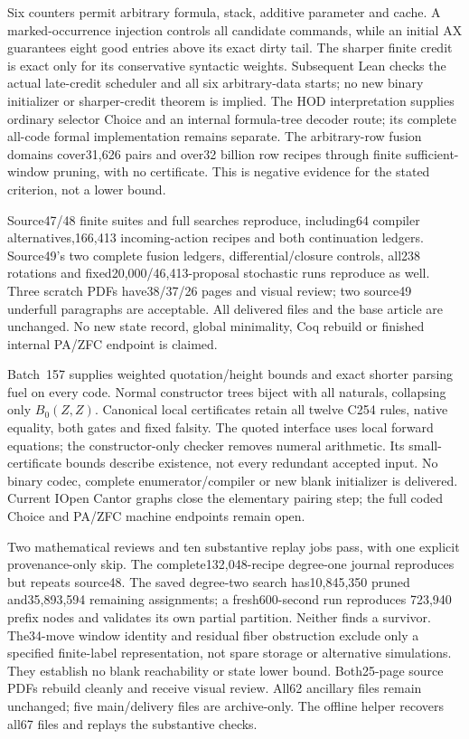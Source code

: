 \documentclass[11pt]{article}
\begin{document}
{Six counters permit arbitrary formula, stack, additive parameter and cache.
A marked-occurrence injection controls all candidate commands, while an initial
AX guarantees eight good entries above its exact dirty tail. The sharper finite
credit is exact only for its conservative syntactic weights. Subsequent Lean
checks the actual late-credit scheduler and all six arbitrary-data starts;
no new binary initializer or sharper-credit theorem is implied. The HOD
interpretation supplies ordinary selector Choice and an internal formula-tree
decoder route; its complete all-code formal implementation remains separate.
The arbitrary-row fusion domains cover31,626 pairs and over32 billion row
recipes through finite sufficient-window pruning, with no certificate. This
is negative evidence for the stated criterion, not a lower bound.

Source47/48 finite suites and full searches reproduce, including64 compiler
alternatives,166,413 incoming-action recipes and both continuation ledgers.
Source49's two complete fusion ledgers, differential/closure controls, all238
rotations and fixed20,000/46,413-proposal stochastic runs reproduce as well.
Three scratch PDFs have38/37/26 pages and visual review; two source49 underfull
paragraphs are acceptable. All delivered files and the base article are unchanged.
No new state record, global minimality, Coq rebuild or finished internal PA/ZFC
endpoint is claimed.

Batch~157 supplies weighted quotation/height bounds and exact shorter parsing
fuel on every code. Normal constructor trees biject with all naturals, collapsing
only $B_0(Z,Z)$. Canonical local certificates retain all twelve C254 rules,
native equality, both gates and fixed falsity. The quoted interface uses local
forward equations; the constructor-only checker removes numeral arithmetic.
Its small-certificate bounds describe existence, not every redundant accepted
input. No binary codec, complete enumerator/compiler or new blank initializer
is delivered. Current IOpen Cantor graphs close the elementary pairing step;
the full coded Choice and PA/ZFC machine endpoints remain open.

Two mathematical reviews and ten substantive replay jobs pass, with one
explicit provenance-only skip. The complete132,048-recipe degree-one journal
reproduces but repeats source48. The saved degree-two search has10,845,350
pruned and35,893,594 remaining assignments; a fresh600-second run reproduces
723,940 prefix nodes and validates its own partial partition. Neither finds a
survivor. The34-move window identity and residual fiber obstruction exclude
only a specified finite-label representation, not spare storage or alternative
simulations. They establish no blank reachability or state lower bound.
Both25-page source PDFs rebuild cleanly and receive visual review. All62
ancillary files remain unchanged; five main/delivery files are archive-only.
The offline helper recovers all67 files and replays the substantive checks.

}
\end{document}
